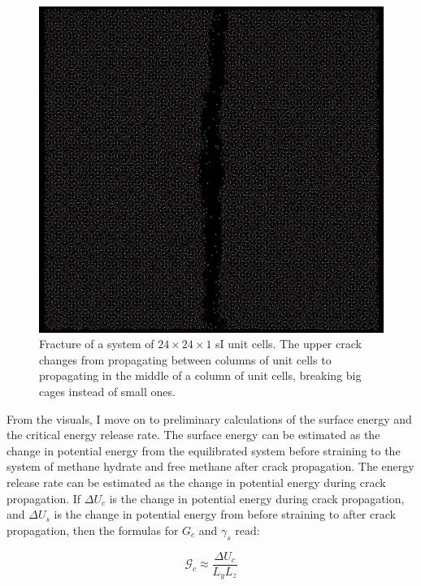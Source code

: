 \begin{figure}
\includegraphics[width=\textwidth]{../pictures/slim_system.pdf}
\caption{Fracture of a system of $24 \times 24 \times 1$ sI unit cells. The upper crack changes from propagating between columns of unit cells to propagating in the middle of a column of unit cells, breaking big cages instead of small ones.}
\label{fig:thin_crack}
\end{figure}

From the visuals, I move on to preliminary calculations of the surface energy and the critical energy release rate. The surface energy can be estimated as the change in potential energy from the equilibrated system before straining to the system of methane hydrate and free methane after crack propagation. The energy release rate can be estimated as the change in potential energy during crack propagation. If $\Delta U_c$ is the change in potential energy during crack propagation, and $\Delta U_s$ is the change in potential energy from before straining to after crack propagation, then the formulas for $G_c$ and $\gamma_s$ read:

\begin{equation}
	\mathcal{G}_c \approx \frac{\Delta U_c}{L_yL_z}
\end{equation}

